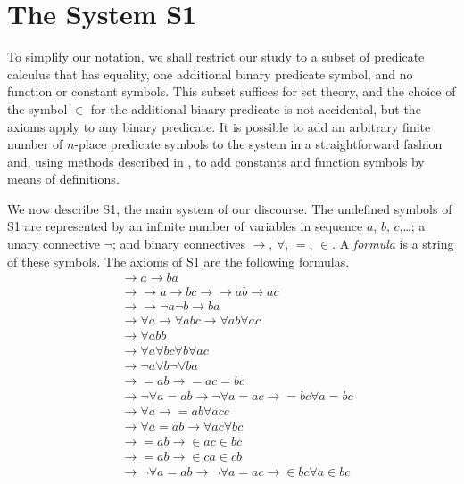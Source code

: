 \documentclass[leqno]{article}
\begin{document}
\section{The System S1}

     To simplify our notation, we shall restrict our study to a subset of
predicate calculus that has equality, one additional binary predicate symbol,
and no function or constant symbols.  This subset suffices for set theory, and
the choice of the symbol $\in $ for the additional binary predicate is not
accidental, but the axioms apply to any binary predicate.  It is possible to
add an arbitrary finite number of $n$-place predicate symbols to the system in
a straightforward fashion and, using methods described in \cite[pp.\
405--420]{Kleene}, to add constants and function symbols by means of
definitions.

     We now describe S1, the main system of our discourse. The
undefined symbols of S1 are represented by
  an infinite number of variables in sequence $a$, $b$, $c$,\ldots;
  a unary connective $\lnot $; and
  binary connectives $\rightarrow $, $\forall $, $=$, $\in $.
A {\em formula} is a string of these symbols.  The axioms of S1 are the
following formulas.
\setcounter{equation}{0}
\renewcommand{\theequation}{A\arabic{equation}}
\begin{eqnarray}
  & \rightarrow a\rightarrow ba \\
  & \rightarrow \rightarrow a\rightarrow bc\rightarrow \rightarrow
  ab\rightarrow ac \\
  & \rightarrow \rightarrow \lnot a\lnot b\rightarrow ba \\
  & \rightarrow \forall a\rightarrow \forall abc\rightarrow \forall
    ab\forall ac \\
  & \rightarrow \forall abb \\
  & \rightarrow \forall a\forall bc\forall b\forall ac \\
  & \rightarrow \lnot a\forall b\lnot \forall ba \\
  & \rightarrow =ab\rightarrow =ac=bc \\
  & \rightarrow \lnot \forall a=ab\rightarrow \lnot \forall
    a=ac\rightarrow =bc\forall a=bc \\
  & \rightarrow \forall a\rightarrow =ab\forall acc \\
  & \rightarrow \forall a=ab\rightarrow \forall ac\forall bc \\
  & \rightarrow =ab\rightarrow \in ac\in bc \\
  & \rightarrow =ab\rightarrow \in ca\in cb \\
  & \rightarrow \lnot \forall a=ab\rightarrow \lnot \forall
    a=ac\rightarrow \in bc\forall a\in bc
\end{eqnarray}
\end{document}
